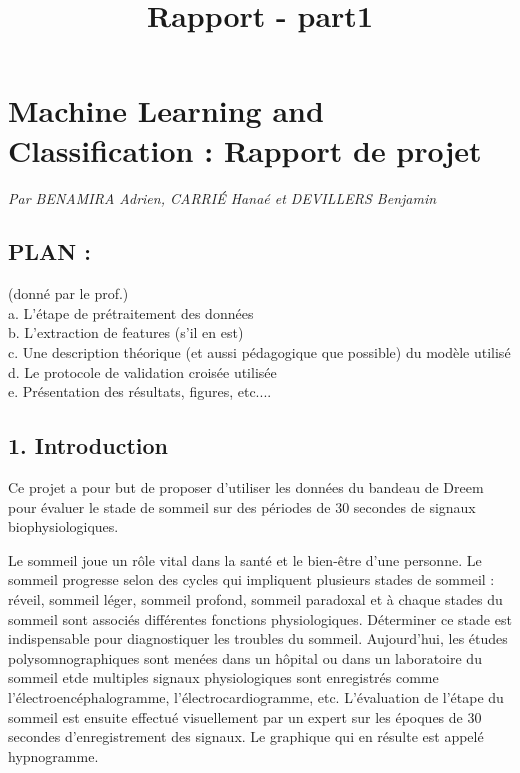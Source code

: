 \documentclass[11pt]{article}
\title{Rapport - part1}
\begin{document}
    
    
    \maketitle
    
    

    
    \section{Machine Learning and Classification : Rapport de
projet}\label{machine-learning-and-classification-rapport-de-projet}

\emph{Par BENAMIRA Adrien, CARRIÉ Hanaé et DEVILLERS Benjamin}

\subsection{PLAN :}\label{plan}

(donné par le prof.)\\
a. L'étape de prétraitement des données\\
b. L'extraction de features (s'il en est)\\
c. Une description théorique (et aussi pédagogique que possible) du
modèle utilisé\\
d. Le protocole de validation croisée utilisée\\
e. Présentation des résultats, figures, etc....

    \subsection{1. Introduction}\label{introduction}

    Ce projet a pour but de proposer d'utiliser les données du bandeau de
Dreem pour évaluer le stade de sommeil sur des périodes de 30 secondes
de signaux biophysiologiques.

Le sommeil joue un rôle vital dans la santé et le bien-être d'une
personne. Le sommeil progresse selon des cycles qui impliquent plusieurs
stades de sommeil : réveil, sommeil léger, sommeil profond, sommeil
paradoxal et à chaque stades du sommeil sont associés différentes
fonctions physiologiques. Déterminer ce stade est indispensable pour
diagnostiquer les troubles du sommeil. Aujourd'hui, les études
polysomnographiques sont menées dans un hôpital ou dans un laboratoire
du sommeil etde multiples signaux physiologiques sont enregistrés comme
l'électroencéphalogramme, l'électrocardiogramme, etc. L'évaluation de
l'étape du sommeil est ensuite effectué visuellement par un expert sur
les époques de 30 secondes d'enregistrement des signaux. Le graphique
qui en résulte est appelé hypnogramme.
\end{document}
